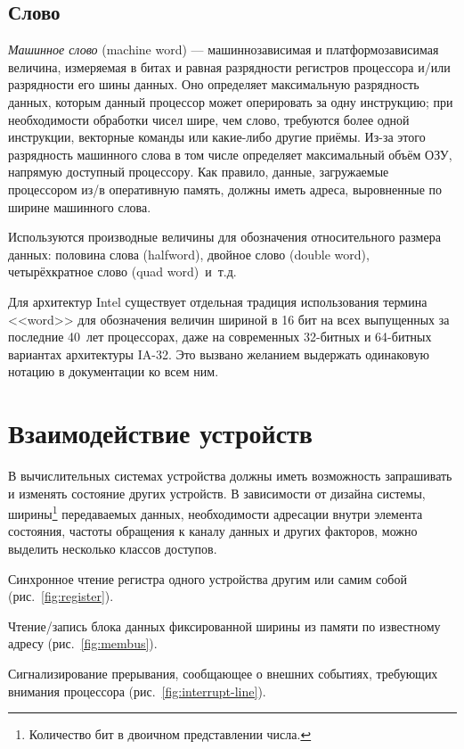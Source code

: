 \subsection{Слово}

\textit{Машинное слово} (\abbr machine word) — машиннозависимая и платформозависимая величина, измеряемая в битах и равная разрядности регистров процессора и/или разрядности его шины данных. Оно определяет максимальную разрядность данных, которым данный процессор может оперировать за одну инструкцию; при необходимости обработки чисел шире, чем слово, требуются более одной инструкции, векторные команды или какие-либо другие приёмы. Из-за этого разрядность машинного слова в том числе определяет максимальный объём ОЗУ, напрямую доступный процессору. Как правило, данные, загружаемые процессором из/в оперативную память, должны иметь адреса, выровненные по ширине машинного слова.

Используются производные величины для обозначения относительного размера данных: половина слова (\abbr halfword), двойное слово (\abbr double word), четырёхкратное слово (\abbr quad word)~и~т.д.

Для архитектур Intel существует отдельная традиция использования термина <<word>> для обозначения величин шириной в 16 бит на всех выпущенных за последние 40~лет процессорах, даже на современных 32-битных и 64-битных вариантах архитектуры IA-32. Это вызвано желанием выдержать одинаковую нотацию в документации ко всем ним.

\section{Взаимодействие устройств}

В вычислительных системах устройства должны иметь возможность запрашивать и изменять состояние других устройств. В зависимости от дизайна системы, ширины\footnote{Количество бит в двоичном представлении числа.} передаваемых данных, необходимости адресации внутри элемента состояния, частоты обращения к каналу данных и других факторов, можно выделить несколько классов доступов.

\begin{itemize*}
\item Синхронное чтение регистра одного устройства другим или самим собой (рис.~\ref{fig:register}).
\item Чтение/запись блока данных фиксированной ширины из памяти по известному адресу (рис.~\ref{fig:membus}). 
\item Сигнализирование прерывания, сообщающее о внешних событиях, требующих внимания процессора (рис.~\ref{fig:interrupt-line}).
\end{itemize*}


